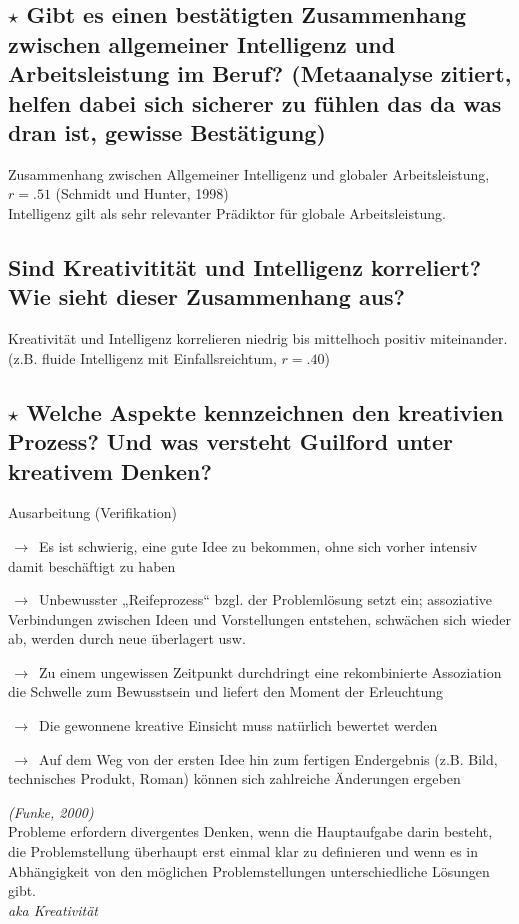 \documentclass[a4paper,9pt,DIV=14]{scrartcl}
\begin{document}
\subsection{$\star$ Gibt es einen bestätigten Zusammenhang zwischen allgemeiner Intelligenz und Arbeitsleistung im Beruf? (Metaanalyse  zitiert, helfen dabei sich sicherer zu fühlen das da was dran ist, gewisse Bestätigung)} %
    Zusammenhang zwischen Allgemeiner Intelligenz und globaler Arbeitsleistung, $r = .51$ (Schmidt und Hunter, 1998)\\
    Intelligenz gilt als sehr relevanter Prädiktor für globale Arbeitsleistung.
\subsection{Sind Kreativitität und Intelligenz korreliert? Wie sieht dieser Zusammenhang aus?}
    Kreativität und Intelligenz korrelieren niedrig bis mittelhoch positiv miteinander.\\
    (z.B. fluide Intelligenz mit Einfallsreichtum, $r = .40$)
\subsection{$\star$ Welche Aspekte kennzeichnen den kreativien Prozess? Und was versteht Guilford unter kreativem Denken?} %
    \begin{labeling}{Ausarbeitung (Verifikation)}
        \item [Vorbereitung] $\,\to\,$ Es ist schwierig, eine gute Idee zu bekommen, ohne sich vorher intensiv damit beschäftigt zu haben
        \item [Inkubation] $\,\to\,$ Unbewusster „Reifeprozess“ bzgl. der Problemlösung setzt ein; assoziative Verbindungen zwischen Ideen und Vorstellungen entstehen, schwächen sich wieder ab, werden durch neue überlagert usw.
        \item [Einsicht (Inspiration)] $\,\to\,$ Zu einem ungewissen Zeitpunkt durchdringt eine rekombinierte Assoziation die Schwelle zum Bewusstsein und liefert den Moment der Erleuchtung
        \item [Bewertung] $\,\to\,$ Die gewonnene kreative Einsicht muss natürlich bewertet werden
        \item [Ausarbeitung (Verifikation)] $\,\to\,$ Auf dem Weg von der ersten Idee hin zum fertigen Endergebnis (z.B. Bild, technisches Produkt, Roman) können sich zahlreiche Änderungen ergeben
    \end{labeling}
    \textit{(Funke, 2000)}\\
    Probleme erfordern divergentes Denken, wenn die Hauptaufgabe darin besteht, die Problemstellung überhaupt erst einmal klar zu definieren und wenn es in Abhängigkeit von den möglichen Problemstellungen unterschiedliche Lösungen gibt.\\
    \textit{aka Kreativität}
\end{document}
